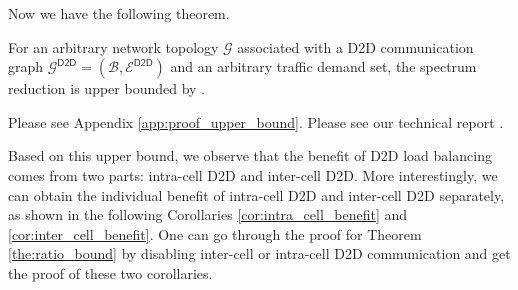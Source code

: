 Now we have the following theorem.

\begin{theorem}
\label{the:ratio_bound}
For an arbitrary network topology $\mathcal{G}$ associated with a D2D communication
graph $\mathcal{G}^{\textsf{D2D}}= (\mathcal{B}, \mathcal{E}^{\textsf{D2D}})$ and an arbitrary
traffic demand set, the  spectrum reduction is upper bounded by
\be
\rho \le {}.
\ee
\end{theorem}
\begin{IEEEproof}
\ifx \ISTR \undefined
Please see Appendix \ref{app:proof_upper_bound}.
\else
Please see  our technical report \cite{TR}.
\fi
\end{IEEEproof}

Based on this upper bound, we observe that the benefit of D2D load
balancing comes from two parts: intra-cell D2D and inter-cell D2D.
More interestingly, we can obtain the individual benefit of intra-cell
D2D and inter-cell D2D separately, as shown in the following Corollaries \ref{cor:intra_cell_benefit}
and \ref{cor:inter_cell_benefit}. One can go through the proof for Theorem \ref{the:ratio_bound}
by disabling inter-cell or intra-cell D2D communication and get the proof of these
two corollaries.



